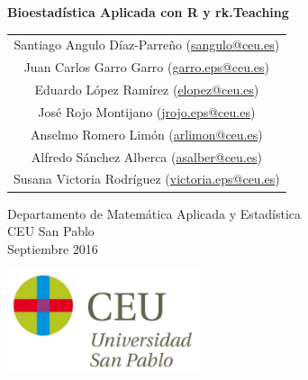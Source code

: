 \begin{titlepage}
% 
% 
\thispagestyle{empty}
\vspace*{7cm}
\par

\begin{center}
\normalfont\fontsize{30}{30}\selectfont
{\bfseries \color{blueceu}Bioestadística Aplicada con R y rk.Teaching}
\end{center}
\vspace{1cm}
\begin{center}
\Large
\begin{tabular}{c}
Santiago Angulo Díaz-Parreño (\url{sangulo@ceu.es})\\
Juan Carlos Garro Garro (\url{garro.eps@ceu.es})\\
Eduardo López Ramírez (\url{elopez@ceu.es})\\
José Rojo Montijano (\url{jrojo.eps@ceu.es})\\
Anselmo Romero Limón (\url{arlimon@ceu.es})\\
Alfredo Sánchez Alberca (\url{asalber@ceu.es})\\
Susana Victoria Rodríguez (\url{victoria.eps@ceu.es})
\end{tabular}

\medskip 
Departamento de Matemática Aplicada y Estadística\\ CEU San Pablo\\[1cm]
\medskip 
Septiembre 2016

\vspace{1cm}
\includegraphics[height=3cm]{img/logo_uspceu}
\end{center}
\vfill
\end{titlepage}